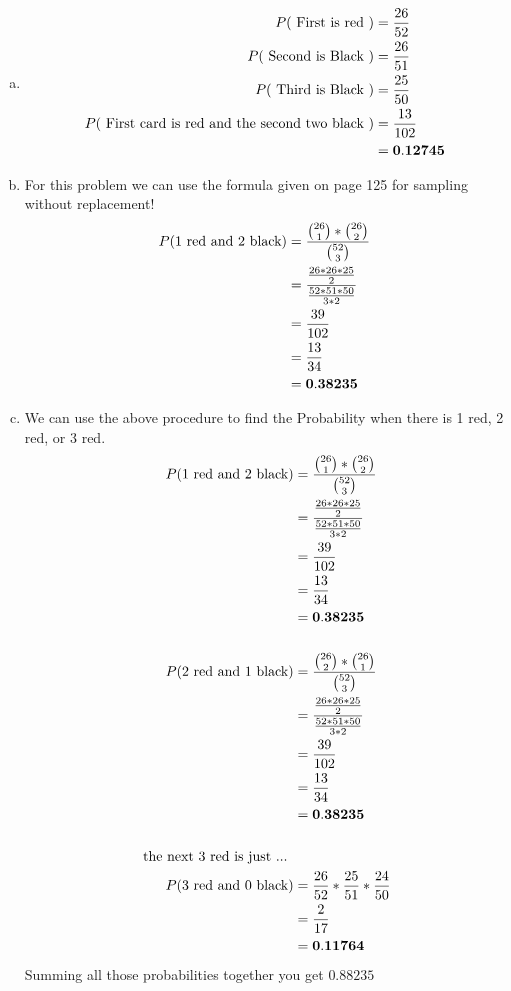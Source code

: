 \documentclass[10pt]{report}
\begin{document}
\subsection{}
 \begin{enumerate}[(a)]
\item \begin{align*}
P(\textnormal{ First is red } ) &= \frac{26}{52} \\
P(\textnormal{ Second is Black } ) &= \frac{26}{51} \\
P(\textnormal{ Third is Black } ) &= \frac{25}{50} \\
P(\textnormal{  First card is red and the second two black } ) &= \frac{13}{102} \\
&= \mathbf{0.12745}
\end{align*}
\item For this problem we can use the formula given on page 125 for sampling without replacement!
\begin{align*}
P(1 \textnormal{ red and } 2 \textnormal{ black}) &= \frac{\binom{26}{1} * \binom{26}{2}}{\binom{52}{3}} \\
&=\frac{\frac{26*26*25}{2}}{\frac{52*51*50}{3*2}} \\
&=\frac{39}{102} \\
&= \frac{13}{34} \\
&= \mathbf{0.38235}
\end{align*}
\item We can use the above procedure to find the Probability when there is 1 red, 2 red, or 3 red.
\begin{align*}
P(1 \textnormal{ red and } 2 \textnormal{ black}) &= \frac{\binom{26}{1} * \binom{26}{2}}{\binom{52}{3}} \\
&=\frac{\frac{26*26*25}{2}}{\frac{52*51*50}{3*2}} \\
&=\frac{39}{102} \\
&= \frac{13}{34} \\
&= \mathbf{0.38235} \\
\\
P(2 \textnormal{ red and } 1 \textnormal{ black}) &= \frac{\binom{26}{2} * \binom{26}{1}}{\binom{52}{3}} \\
&=\frac{\frac{26*26*25}{2}}{\frac{52*51*50}{3*2}} \\
&=\frac{39}{102} \\
&= \frac{13}{34} \\
&= \mathbf{0.38235} \\
\\
\textnormal{ the next 3 red is just ... } \\
P(3 \textnormal{ red and } 0 \textnormal{ black}) &= \frac{26}{52} * \frac{25}{51} * \frac{24}{50} \\
&= \frac{2}{17} \\
& = \mathbf{0.11764}
\end{align*}
Summing all those probabilities together you get $\mathbf{0.88235} $
\end{enumerate}
\setcounter{subsection}{6}
\end{document}
